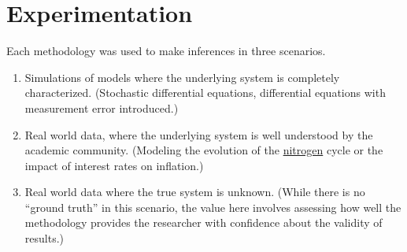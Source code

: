 \documentclass{article}
\begin{document}
\section*{Experimentation}

Each methodology was used to make inferences in three scenarios.
\begin{enumerate}
    \item Simulations of models where the underlying system is completely characterized. 
    (Stochastic differential equations, differential equations with measurement error introduced.)
    \item Real world data, where the underlying system is well understood by the academic community.
    (Modeling the evolution of the \href{https://www.sciencedirect.com/science/article/pii/S0045653520316866}{nitrogen}
    cycle or the impact of interest rates on inflation.)
    \item Real world data where the true system is unknown. (While there is no ``ground truth''
    in this scenario, the value here involves assessing how well the methodology provides the
    researcher with confidence about the validity of results.)
\end{enumerate}




\end{document}
